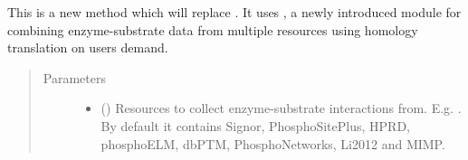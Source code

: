 \documentclass[letterpaper,10pt,english]{sphinxmanual}
\begin{document}
\begin{fulllineitems}
\begin{fulllineitems}
\label{\detokenize{main:pypath.main.PyPath.load_pnetworks_dmi}}
\end{fulllineitems}


\begin{fulllineitems}
\label{\detokenize{main:pypath.main.PyPath.load_psite_phos}}
\end{fulllineitems}


\begin{fulllineitems}
\label{\detokenize{main:pypath.main.PyPath.load_psite_reg}}
\end{fulllineitems}


\begin{fulllineitems}
\label{\detokenize{main:pypath.main.PyPath.load_ptms}}
\end{fulllineitems}


\begin{fulllineitems}
\label{\detokenize{main:pypath.main.PyPath.load_ptms2}}
This is a new method which will replace .
It uses , a newly introduced
module for combining enzyme-substrate data from multiple
resources using homology translation on users demand.
\begin{quote}\begin{description}
\item[{Parameters}] \leavevmode\begin{itemize}
\item {} 
 () \textendash{} Resources to collect enzyme-substrate
interactions from. E.g. . By default
it contains Signor, PhosphoSitePlus, HPRD, phosphoELM, dbPTM,
PhosphoNetworks, Li2012 and MIMP.


\end{itemize}
\end{description}
\end{quote}
\end{fulllineitems}
\end{fulllineitems}
\end{document}

